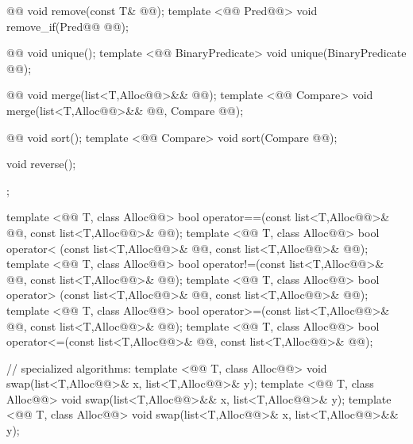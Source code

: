 \documentclass[american,twoside]{book}
\begin{document}
\begin{codeblock}
{{    @@ void remove(const T& @@);
    template <@@ Pred@@> void remove_if(Pred@@ @@);

    @@ void unique();
    template <@@ BinaryPredicate>
      void unique(BinaryPredicate @@);

    @@ void merge(list<T,Alloc@@>&& @@);
    template <@@ Compare> 
      void merge(list<T,Alloc@@>&& @@, Compare @@);

    @@ void sort();
    template <@@ Compare> 
      void sort(Compare @@);

    void reverse();
  };

  template <@@ T, class Alloc@@>
    bool operator==(const list<T,Alloc@@>& @@, const list<T,Alloc@@>& @@);
  template <@@ T, class Alloc@@>
    bool operator< (const list<T,Alloc@@>& @@, const list<T,Alloc@@>& @@);
  template <@@ T, class Alloc@@>
    bool operator!=(const list<T,Alloc@@>& @@, const list<T,Alloc@@>& @@);
  template <@@ T, class Alloc@@>
    bool operator> (const list<T,Alloc@@>& @@, const list<T,Alloc@@>& @@);
  template <@@ T, class Alloc@@>
    bool operator>=(const list<T,Alloc@@>& @@, const list<T,Alloc@@>& @@);
  template <@@ T, class Alloc@@>
    bool operator<=(const list<T,Alloc@@>& @@, const list<T,Alloc@@>& @@);

  // specialized algorithms:
  template <@@ T, class Alloc@@>
    void swap(list<T,Alloc@@>& x, list<T,Alloc@@>& y);
  template <@@ T, class Alloc@@>
    void swap(list<T,Alloc@@>&& x, list<T,Alloc@@>& y);
  template <@@ T, class Alloc@@>
    void swap(list<T,Alloc@@>& x, list<T,Alloc@@>&& y);

}
\end{codeblock}
\end{document}
